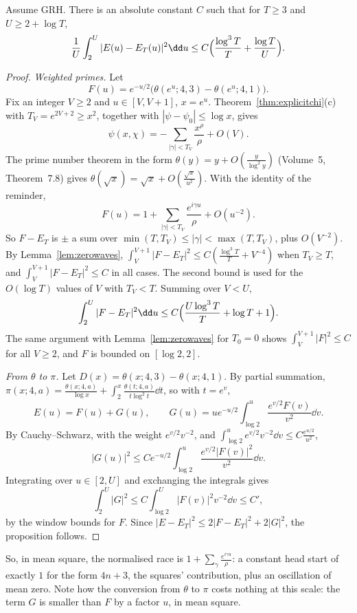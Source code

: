 \begin{proposition}\label{prop:racel2}
Assume GRH. There is an absolute constant $C$ such that for $T\ge3$ and $U\ge2+\log T$,
\[
\frac1U\int_2^U|E(u)-E_T(u)|^2\dd u\le C\Bigl(\frac{\log^3T}T+\frac{\log T}U\Bigr).
\]
\end{proposition}
\begin{proof}
\emph{Weighted primes.} Let
\[
F(u)=e^{-u/2}\bigl(\theta(e^u;4,3)-\theta(e^u;4,1)\bigr).
\]
Fix an integer $V\ge2$ and $u\in[V,V+1]$, $x=e^u$. Theorem~\ref{thm:explicitchi}(c) with $T_V=e^{2V+2}\ge x^2$, together with $|\psi-\psi_0|\le\log x$, gives
\[
\psi(x,\chi)=-\sum_{|\gamma|<T_V}\frac{x^\rho}\rho+O(V).
\] The prime number theorem in the form $\theta(y)=y+O(\frac y{\log^2y})$ (Volume~5, Theorem~7.8) gives $\theta(\sqrt x)=\sqrt x+O(\frac{\sqrt x}{u^2})$. With the identity of the reminder,
\[
F(u)=1+\sum_{|\gamma|<T_V}\frac{e^{i\gamma u}}\rho+O(u^{-2}).
\]
So $F-E_T$ is $\pm$ a sum over $\min(T,T_V)\le|\gamma|<\max(T,T_V)$, plus $O(V^{-2})$. By Lemma~\ref{lem:zerowaves}, $\int_V^{V+1}|F-E_T|^2\le C(\frac{\log^3T}T+V^{-4})$ when $T_V\ge T$, and $\int_V^{V+1}|F-E_T|^2\le C$ in all cases. The second bound is used for the $O(\log T)$ values of $V$ with $T_V<T$. Summing over $V<U$,
\[
\int_2^U|F-E_T|^2\dd u\le C\Bigl(\frac{U\log^3T}T+\log T+1\Bigr).
\]
The same argument with Lemma~\ref{lem:zerowaves} for $T_0=0$ shows $\int_V^{V+1}|F|^2\le C$ for all $V\ge2$, and $F$ is bounded on $[\log2,2]$.

\emph{From $\theta$ to $\pi$.} Let $D(x)=\theta(x;4,3)-\theta(x;4,1)$. By partial summation, $\pi(x;4,a)=\frac{\theta(x;4,a)}{\log x}+\int_2^x\frac{\theta(t;4,a)}{t\log^2t}\dd t$, so with $t=e^v$,
\[
E(u)=F(u)+G(u),\qquad G(u)=ue^{-u/2}\int_{\log2}^u\frac{e^{v/2}F(v)}{v^2}\dd v.
\]
By Cauchy--Schwarz, with the weight $e^{v/2}v^{-2}$, and $\int_{\log2}^ue^{v/2}v^{-2}\dd v\le C\frac{e^{u/2}}{u^2}$,
\[
|G(u)|^2\le C e^{-u/2}\int_{\log2}^u\frac{e^{v/2}|F(v)|^2}{v^2}\dd v.
\]
Integrating over $u\in[2,U]$ and exchanging the integrals gives
\[
\int_2^U|G|^2\le C\int_{\log2}^U|F(v)|^2v^{-2}\dd v\le C',
\]
by the window bounds for $F$. Since $|E-E_T|^2\le2|F-E_T|^2+2|G|^2$, the proposition follows.
\end{proof}

So, in mean square, the normalised race is $1+\sum_\gamma\frac{e^{i\gamma u}}\rho$: a constant head start of exactly $1$ for the form $4n+3$, the squares' contribution, plus an oscillation of mean zero. Note how the conversion from $\theta$ to $\pi$ costs nothing at this scale: the term $G$ is smaller than $F$ by a factor $u$, in mean square.


